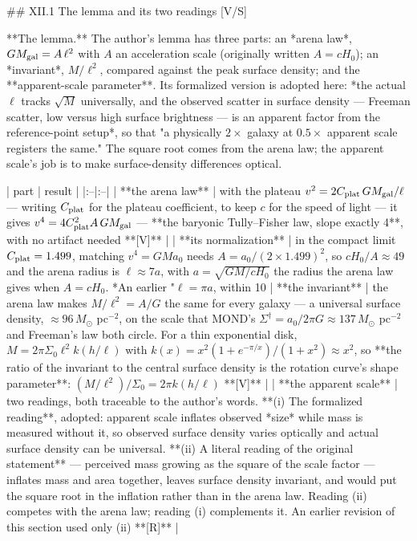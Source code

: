 ## XII.1 The lemma and its two readings [V/S]

**The lemma.** The author's lemma has three parts: an *arena law*, $GM_{\rm gal} = A\,\ell^2$ with $A$ an acceleration scale (originally written $A = cH_0$); an *invariant*, $M/\ell^2$, compared against the peak surface density; and the **apparent-scale parameter**. Its formalized version is adopted here: *the actual $\ell$ tracks $\sqrt M$ universally, and the observed scatter in surface density — Freeman scatter, low versus high surface brightness — is an apparent factor from the reference-point setup*, so that "a physically $2\times$ galaxy at $0.5\times$ apparent scale registers the same." The square root comes from the arena law; the apparent scale's job is to make surface-density differences optical.

| part | result |
|:--|:--|
| **the arena law** | with the plateau $v^2 = 2C_{\rm plat}\,GM_{\rm gal}/\ell$ — writing $C_{\rm plat}$ for the plateau coefficient, to keep $c$ for the speed of light — it gives $v^4 = 4C_{\rm plat}^2A\,GM_{\rm gal}$ — **the baryonic Tully–Fisher law, slope exactly 4**, with no artifact needed **[V]** |
| **its normalization** | in the compact limit $C_{\rm plat} = 1.499$, matching $v^4 = GMa_0$ needs $A = a_0/(2\times1.499)^2$, so $cH_0/A\approx49$ and the arena radius is $\ell\approx7a$, with $a = \sqrt{GM/cH_0}$ the radius the arena law gives when $A = cH_0$. *An earlier "$\ell = \pi a$, within 10%
| **the invariant** | the arena law makes $M/\ell^2 = A/G$ the same for every galaxy — a universal surface density, $\approx96\,M_\odot$ pc$^{-2}$, on the scale that MOND's $\Sigma^\dagger = a_0/2\pi G\approx137\,M_\odot$ pc$^{-2}$ and Freeman's law both circle. For a thin exponential disk, $M = 2\pi\Sigma_0\ell^2k(h/\ell)$ with $k(x) = x^2(1+e^{-\pi/x})/(1+x^2)\approx x^2$, so **the ratio of the invariant to the central surface density is the rotation curve's shape parameter**: $(M/\ell^2)/\Sigma_0 = 2\pi k(h/\ell)$ **[V]** |
| **the apparent scale** | two readings, both traceable to the author's words. **(i) The formalized reading**, adopted: apparent scale inflates observed *size* while mass is measured without it, so observed surface density varies optically and actual surface density can be universal. **(ii) A literal reading of the original statement** — perceived mass growing as the square of the scale factor — inflates mass and area together, leaves surface density invariant, and would put the square root in the inflation rather than in the arena law. Reading (ii) competes with the arena law; reading (i) complements it. An earlier revision of this section used only (ii) **[R]** |

